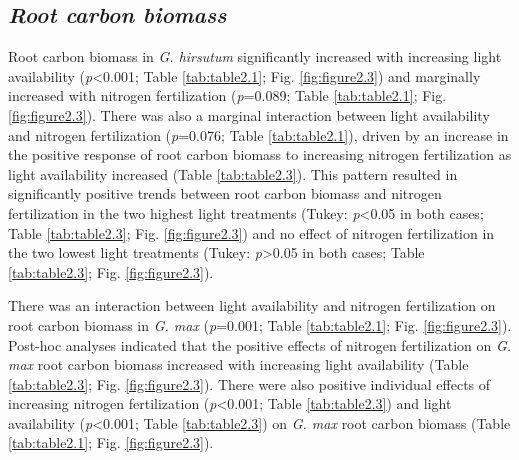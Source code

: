 \subsection{\textit{Root carbon biomass}}
\noindent Root carbon biomass in \textit{G. hirsutum} significantly increased with increasing light availability (\textit{p}<0.001; Table \ref{tab:table2.1}; Fig. \ref{fig:figure2.3}) and marginally increased with nitrogen fertilization (\textit{p}=0.089; Table \ref{tab:table2.1}; Fig. \ref{fig:figure2.3}). There was also a marginal interaction between light availability and nitrogen fertilization (\textit{p}=0.076; Table \ref{tab:table2.1}), driven by an increase in the positive response of root carbon biomass to increasing nitrogen fertilization as light availability increased (Table \ref{tab:table2.3}). This pattern resulted in significantly positive trends between root carbon biomass and nitrogen fertilization in the two highest light treatments (Tukey: \textit{p}<0.05 in both cases; Table \ref{tab:table2.3}; Fig. \ref{fig:figure2.3}) and no effect of nitrogen fertilization in the two lowest light treatments (Tukey: \textit{p}>0.05 in both cases; Table \ref{tab:table2.3}; Fig. \ref{fig:figure2.3}). 

There was an interaction between light availability and nitrogen fertilization on root carbon biomass in \textit{G. max} (\textit{p}=0.001; Table \ref{tab:table2.1}; Fig. \ref{fig:figure2.3}). Post-hoc analyses indicated that the positive effects of nitrogen fertilization on \textit{G. max} root carbon biomass increased with increasing light availability (Table \ref{tab:table2.3}; Fig. \ref{fig:figure2.3}). There were also positive individual effects of increasing nitrogen fertilization (\textit{p}<0.001; Table \ref{tab:table2.3}) and light availability (\textit{p}<0.001; Table \ref{tab:table2.3}) on \textit{G. max} root carbon biomass (Table \ref{tab:table2.1}; Fig. \ref{fig:figure2.3}).

